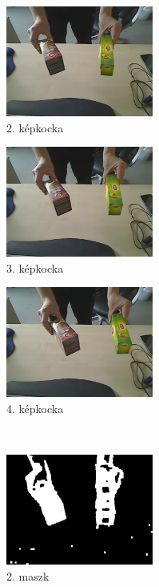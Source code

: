 \begin{figure}[tbh]
\centering
\begin{subfigure}[b]{.32\linewidth}
	\centering
	\includegraphics[width=137pt]{figures/frame_ofmask_101.png}
	\caption{2. képkocka}
  \end{subfigure}
\begin{subfigure}[b]{.32\linewidth}
	\centering
	\includegraphics[width=137pt]{figures/frame_ofmask_104.png}
	\caption{3. képkocka}
  \end{subfigure}
\begin{subfigure}[b]{.32\linewidth}
	\centering
	\includegraphics[width=137pt]{figures/frame_ofmask_107.png}
	\caption{4. képkocka}
  \end{subfigure}\\
\begin{subfigure}[b]{.32\linewidth}
	\centering
	\includegraphics[width=137pt]{figures/mask_ofmask_101.png}
	\caption{2. maszk}
  \end{subfigure}
\begin{subfigure}[b]{.32\linewidth}

\end{subfigure}
\end{figure}
